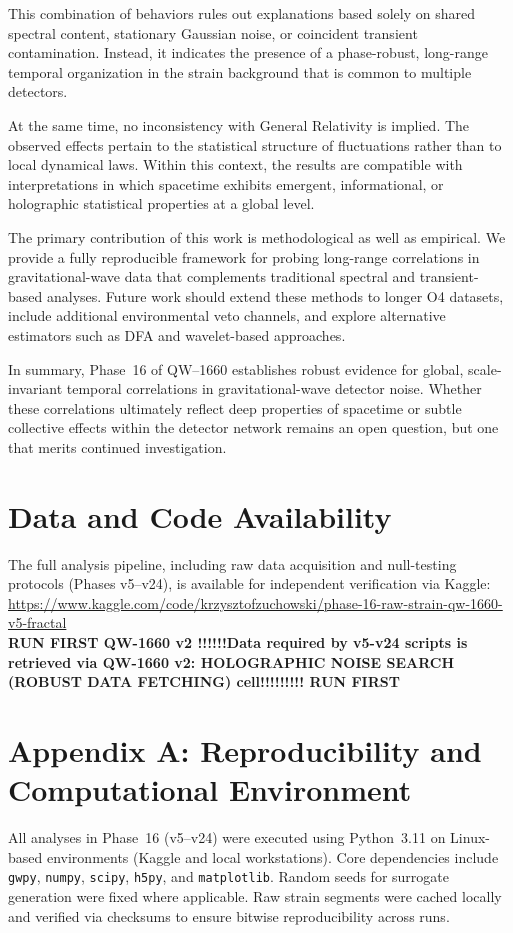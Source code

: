 \documentclass[11pt,a4paper]{article}
\begin{document}
This combination of behaviors rules out explanations based solely on shared spectral content, stationary Gaussian noise, or coincident transient contamination. Instead, it indicates the presence of a phase-robust, long-range temporal organization in the strain background that is common to multiple detectors.

At the same time, no inconsistency with General Relativity is implied. The observed effects pertain to the statistical structure of fluctuations rather than to local dynamical laws. Within this context, the results are compatible with interpretations in which spacetime exhibits emergent, informational, or holographic statistical properties at a global level.

The primary contribution of this work is methodological as well as empirical. We provide a fully reproducible framework for probing long-range correlations in gravitational-wave data that complements traditional spectral and transient-based analyses. Future work should extend these methods to longer O4 datasets, include additional environmental veto channels, and explore alternative estimators such as DFA and wavelet-based approaches.

In summary, Phase~16 of QW--1660 establishes robust evidence for global, scale-invariant temporal correlations in gravitational-wave detector noise. Whether these correlations ultimately reflect deep properties of spacetime or subtle collective effects within the detector network remains an open question, but one that merits continued investigation.

\section*{Data and Code Availability}
The full analysis pipeline, including raw data acquisition and null-testing protocols (Phases v5--v24), is available for independent verification via Kaggle: \\
\url{https://www.kaggle.com/code/krzysztofzuchowski/phase-16-raw-strain-qw-1660-v5-fractal} \\
\textbf{RUN FIRST QW-1660 v2 !!!!!!Data required by v5-v24 scripts is retrieved via QW-1660 v2: HOLOGRAPHIC NOISE SEARCH (ROBUST DATA FETCHING) cell!!!!!!!!! RUN FIRST}


\appendix
\section{Appendix A: Reproducibility and Computational Environment}
All analyses in Phase~16 (v5--v24) were executed using Python~3.11 on Linux-based environments (Kaggle and local workstations). Core dependencies include \texttt{gwpy}, \texttt{numpy}, \texttt{scipy}, \texttt{h5py}, and \texttt{matplotlib}. Random seeds for surrogate generation were fixed where applicable. Raw strain segments were cached locally and verified via checksums to ensure bitwise reproducibility across runs.
\end{document}

